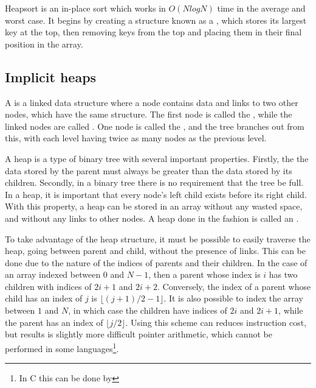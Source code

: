 
Heapsort is an in-place sort which works in $O(NlogN)$ time in the average and
worst case. It begins by creating a structure known as a , which stores
its largest key at the top, then removing keys from the top and placing them in
their final position in the array.

\subsection{Implicit heaps}

A  is a linked data structure where a node contains data and links
to two other nodes, which have the same structure. The first node is called the
, while the linked nodes are called . One node is called the
, and the tree branches out from this, with each level having twice as many
nodes as the previous level.

A heap is a type of binary tree with several important properties. Firstly, the
the data stored by the parent must always be greater than the data stored by its
children. Secondly, in a binary tree there is no requirement that the tree be full.
In a heap, it is important that every node's left child exists before its right
child. With this property, a heap can be stored in an array without any wasted
space, and without any links to other nodes. A heap done in the fashion is
called an .

To take advantage of the heap structure, it must be possible to easily traverse
the heap, going between parent and child, without the presence of links. This
can be done due to the nature of the indices of parents and their children. In
the case of an array indexed between $0$ and $N-1$, then a 
parent whose index is $i$ has two children with indices of
$2i+1$ and $2i+2$. Conversely, the index of a parent whose child has an index
of $j$ is $\lfloor{}(j+1)/2-1\rfloor{}$. It is also possible to index the array between $1$
and $N$, in which case the children have indices of $2i$ and $2i+1$, while the parent
has an index of $\lfloor{}j/2\rfloor{}$. Using this scheme can reduces instruction cost, but
results is slightly more difficult pointer arithmetic, which cannot be performed
in some languages\footnote{In C this can be done by }.

